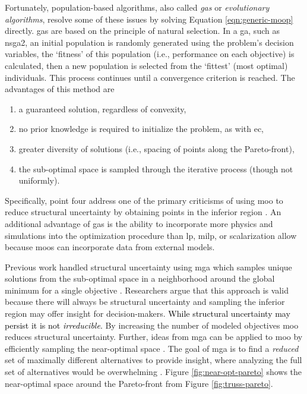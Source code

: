 Fortunately, population-based algorithms, also called \textit{\acp{ga}} or
\textit{evolutionary algorithms}, resolve some of these issues by solving
Equation \ref{eqn:generic-moop} directly. \Acp{ga} are based on the principle of
natural selection. In a \ac{ga}, such as \ac{nsga2}, an initial population is
randomly generated using the problem's decision variables, the `fitness' of this
population (i.e., performance on each objective) is calculated, then a new
population is selected from the `fittest' (most optimal) individuals. This
process continues until a convergence criterion is reached. The advantages of
this method are
\begin{enumerate}
    \item a guaranteed solution, regardless of convexity,
    \item no prior knowledge is required to initialize the problem, as with
    \ac{ec},
    \item greater diversity of solutions (i.e., spacing of points along the
    Pareto-front),
    \item the sub-optimal space is sampled through the iterative process (though
    not uniformly).
\end{enumerate}
Specifically, point four address one of the primary criticisms of using \ac{moo}
to reduce structural uncertainty by obtaining points in the inferior region
\cite{loughlin_genetic_2001,zechman_evolutionary_2004,
zechman_evolutionary_2013}. An additional advantage of \acp{ga} is the ability
to incorporate more physics and simulations into the optimization procedure than
\ac{lp}, \ac{milp}, or scalarization allow \cite{loughlin_genetic_2001} because 
\acp{moo} can incorporate data from external models. 

Previous work handled structural uncertainty using \ac{mga} which samples unique
solutions from the sub-optimal space in a neighborhood around the global minimum
for a single objective \cite{decarolis_using_2011}. Researchers argue that this
approach is valid because there will always be structural uncertainty and
sampling the inferior region may offer insight for decision-makers.
\textcolor{black}{While structural uncertainty may persist it is not
\textit{irreducible}.} By increasing the number of modeled objectives \ac{moo}
reduces structural uncertainty. Further, ideas from \ac{mga} can be applied to
\ac{moo} by efficiently sampling the near-optimal space
\cite{loughlin_genetic_2001,
zechman_evolutionary_2004,zechman_evolutionary_2013,pajares_comparison_2021}.
The goal of \ac{mga} is to find a \textit{reduced} set of maximally different
alternatives to provide insight, where analyzing the full set of alternatives
would be overwhelming \cite{decarolis_using_2011, pajares_comparison_2021}.
Figure \ref{fig:near-opt-pareto} shows the near-optimal space around the
Pareto-front from Figure \ref{fig:truss-pareto}.

